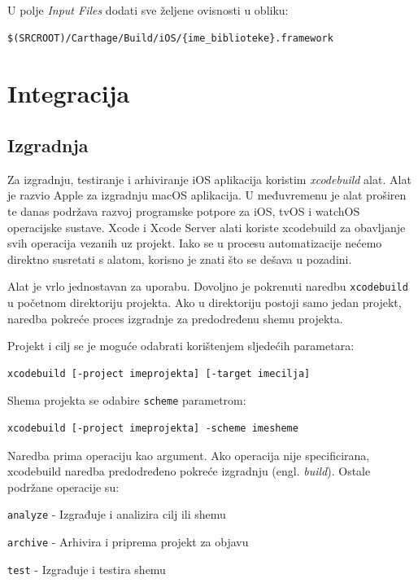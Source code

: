 \documentclass[times, utf8, diplomski, numeric]{fer}
\newcommand{\eng}[1]{(engl. \textit{#1})}
\begin{document}
\begin{appendices}
U polje \textit{Input Files} dodati sve željene ovisnosti u obliku:

\begin{verbatim}
$(SRCROOT)/Carthage/Build/iOS/{ime_biblioteke}.framework
\end{verbatim}


\section{Integracija}

\subsection{Izgradnja} \label{IzgradnjeDodatak}

Za izgradnju, testiranje i arhiviranje iOS aplikacija koristim \textit{xcodebuild} alat. Alat je razvio Apple za izgradnju macOS aplikacija. U međuvremenu je alat proširen te danas podržava razvoj programske potpore za iOS, tvOS i watchOS operacijske sustave. Xcode i Xcode Server alati koriste xcodebuild za obavljanje svih operacija vezanih uz projekt. Iako se u procesu automatizacije nećemo direktno susretati s alatom, korisno je znati što se dešava u pozadini.

Alat je vrlo jednostavan za uporabu. Dovoljno je pokrenuti naredbu \verb|xcodebuild| u početnom direktoriju projekta. Ako u direktoriju postoji samo jedan projekt, naredba pokreće proces izgradnje za predodređenu shemu projekta.

Projekt i cilj se je moguće odabrati korištenjem sljedećih parametara:

\begin{verbatim}
xcodebuild [-project imeprojekta] [-target imecilja]
\end{verbatim}

Shema projekta se odabire \verb|scheme| parametrom:

\begin{verbatim}
xcodebuild [-project imeprojekta] -scheme imesheme
\end{verbatim}

Naredba prima operaciju kao argument. Ako operacija nije specificirana, xcodebuild naredba predodređeno pokreće izgradnju \eng{build}. Ostale podržane operacije su:

\verb|analyze| - Izgrađuje i analizira cilj ili shemu

\verb|archive| - Arhivira i priprema projekt za objavu

\verb|test| - Izgrađuje i testira shemu


\end{appendices}
\end{document}
